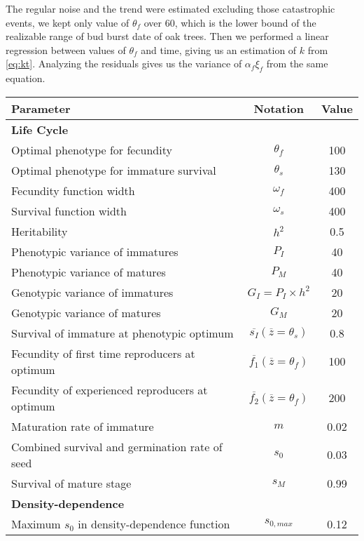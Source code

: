 The regular noise and the trend were estimated excluding those catastrophic events, we kept only value of $\theta_f$ over 60, which is the lower bound of the realizable range of bud burst date of oak trees. Then we performed a linear regression between values of $\theta_f$ and time, giving us an estimation of $k$ from \autoref{eq:kt}. Analyzing the residuals gives us the variance of $\alpha_f \xi_f$ from the same equation.

\begin{table}
\begin{center}
	\begin{tabular}{l c c}
		\hline \hline
		Parameter & Notation & Value \\
		\hline
		\multicolumn{3}{l}{\textbf{Life Cycle}} \\
		Optimal phenotype for fecundity & $\theta_{f}$ & 100 \\
		Optimal phenotype for immature survival & $\theta_{s}$ & 130 \\
		Fecundity function width & $\omega_{f}$ & 400 \\
		Survival function width & $\omega_{s}$ & 400 \\
		Heritability & $h^2$ & 0.5 \\
		Phenotypic variance of immatures & $P_{I}$ & 40 \\
		Phenotypic variance of matures & $P_{M}$ & 40 \\
		Genotypic variance of immatures & $G_{I} = P_{I} \times h^2$ & 20 \\
		Genotypic variance of matures & $G_{M}$ & 20 \\
		Survival of immature at phenotypic optimum & $\overline{s_{I}}(\overline{z} = \theta_{s})$ & 0.8 \\
		Fecundity of first time reproducers at optimum & $\overline{f_{1}}(\overline{z} = \theta_{f})$ & 100 \\
		Fecundity of experienced reproducers at optimum & $\overline{f_{2}}(\overline{z} = \theta_{f})$ & 200 \\
		Maturation rate of immature & $m$ & 0.02 \\
		Combined survival and germination rate of seed & $s_{0}$ & 0.03 \\
		Survival of mature stage & $s_{M}$ & 0.99 \\
		\multicolumn{3}{l}{\textbf{Density-dependence}} \\
		Maximum $s_{0}$ in density-dependence function & $s_{0, max}$ & 0.12 \\

\end{tabular}
\end{center}
\end{table}
